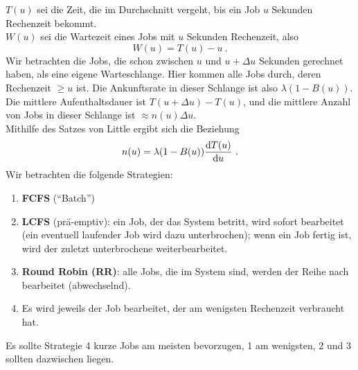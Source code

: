 $T(u)$ sei die Zeit, die im Durchschnitt vergeht, bis ein Job $u$ Sekunden Rechenzeit bekommt. \\
$W(u)$ sei die Wartezeit eines Jobs mit $u$ Sekunden Rechenzeit, also
\[W(u) = T(u) - u ~. \]
Wir betrachten die Jobs, die schon zwischen $u$ und $u+\Delta u$ Sekunden gerechnet haben, als eine eigene Warteschlange. Hier kommen alle Jobs durch, deren
Rechenzeit $\geq u$ ist. Die Ankunftsrate in dieser Schlange ist also $\lambda(1-B(u))$.\\
Die mittlere Aufenthaltsdauer ist $T(u+\Delta u) - T(u)$, und die mittlere Anzahl von Jobs in dieser Schlange ist $\approx n(u)\Delta u$. \\
Mithilfe des Satzes von Little ergibt sich die Beziehung
\[n(u)=\lambda (1-B(u))\frac{\mathop{}\!\mathrm{d} T(u)}{\mathop{}\!\mathrm{d} u} ~.  \]
Wir betrachten die folgende Strategien:
\begin{enumerate}
\item {\bf FCFS} (\enquote{Batch})
\item {\bf LCFS} (prä-emptiv): ein Job, der das System betritt, wird sofort bearbeitet (ein eventuell laufender Job wird dazu unterbrochen); wenn ein Job fertig
ist, wird der zuletzt unterbrochene weiterbearbeitet.
\item {\bf {}Round Robin (RR)}: alle Jobs, die im System sind, werden der Reihe nach bearbeitet (abwechselnd).
\item Es wird jeweils der Job bearbeitet, der am wenigsten Rechenzeit verbraucht hat.
\end{enumerate}
Es sollte Strategie 4 kurze Jobs am meisten bevorzugen, 1 am wenigsten, 2 und 3 sollten dazwischen liegen.

